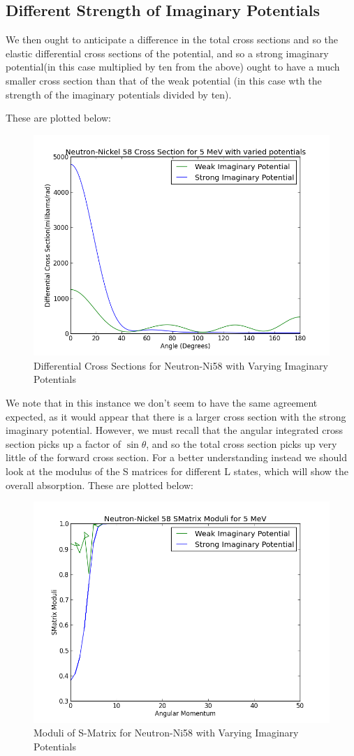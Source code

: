 \documentclass[paper=a4, fontsize=11pt]{scrartcl} %
\numberwithin{equation}{section} %
\numberwithin{figure}{section} %
\numberwithin{table}{section} %
\begin{document}
\subsection{Different Strength of Imaginary Potentials}

We then ought to anticipate a difference in the total cross sections and so the elastic differential cross sections of the potential, and so a strong imaginary potential(in this case multiplied by ten from the above) ought to have a much smaller cross section than that of the weak potential (in this case wth the strength of the imaginary potentials divided by ten).

These are plotted below:

 \begin{figure}[hbt!]
        \centering
\includegraphics[width=.6\textwidth]{Imcross}
        \caption{Differential Cross Sections for Neutron-Ni58 with Varying Imaginary Potentials}
\end{figure}
We note that in this instance we don't seem to have the same agreement expected, as it would appear that there is a larger cross section with the strong imaginary potential. However, we must recall that the angular integrated cross section picks up a factor of $\sin\theta$, and so the total cross section picks up very little of the forward cross section. For a better understanding instead we should look at the modulus of the S matrices for different L states, which will show the overall absorption. These are plotted below:\\


 \begin{figure}[hbt!]
        \centering
\includegraphics[width=.6\textwidth]{NeutronSms}

        \caption{Moduli of S-Matrix for Neutron-Ni58 with Varying Imaginary Potentials}
\end{figure}
\end{document}
